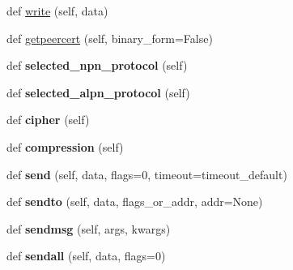 \begin{DoxyCompactItemize}
def \hyperlink{classgevent_1_1__sslgte279_1_1_s_s_l_socket_a55804d5dfc2119e25dc26614c9e00076}{write} (self, data)
\item 
def \hyperlink{classgevent_1_1__sslgte279_1_1_s_s_l_socket_ae78b9eb036c889ab8ea89a3fb49362ad}{getpeercert} (self, binary\+\_\+form=False)
\item 
\mbox{\label{classgevent_1_1__sslgte279_1_1_s_s_l_socket_a2fb785d1e29d86e67cd114ae787f3d6a}} 
def {\bfseries selected\+\_\+npn\+\_\+protocol} (self)
\item 
\mbox{\label{classgevent_1_1__sslgte279_1_1_s_s_l_socket_acf8b3cc3bd52a51ec7a118f4bf150085}} 
def {\bfseries selected\+\_\+alpn\+\_\+protocol} (self)
\item 
\mbox{\label{classgevent_1_1__sslgte279_1_1_s_s_l_socket_a3fa6093cfc4ab9fd9b081e742a115fd5}} 
def {\bfseries cipher} (self)
\item 
\mbox{\label{classgevent_1_1__sslgte279_1_1_s_s_l_socket_a1f999693c41af73a4c05f99eb78dbd64}} 
def {\bfseries compression} (self)
\item 
\mbox{\label{classgevent_1_1__sslgte279_1_1_s_s_l_socket_aaf817fa4dd6e3ce91ee22163b2e31e96}} 
def {\bfseries send} (self, data, flags=0, timeout=timeout\+\_\+default)
\item 
\mbox{\label{classgevent_1_1__sslgte279_1_1_s_s_l_socket_ab797a28beb36fe8dd6a226c88af1f216}} 
def {\bfseries sendto} (self, data, flags\+\_\+or\+\_\+addr, addr=None)
\item 
\mbox{\label{classgevent_1_1__sslgte279_1_1_s_s_l_socket_aa3a18e824845181a9013166de6d2804a}} 
def {\bfseries sendmsg} (self, args, kwargs)
\item 
\mbox{\label{classgevent_1_1__sslgte279_1_1_s_s_l_socket_a534efc2f6383cfe7ececa1f9381c0096}} 
def {\bfseries sendall} (self, data, flags=0)
\item 

\end{DoxyCompactItemize}
